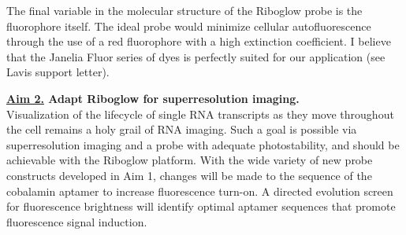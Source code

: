 
The final variable in the molecular structure of the Riboglow probe is the fluorophore itself. The ideal probe would minimize cellular autofluorescence through the use of a red fluorophore with a high extinction coefficient. I believe that the Janelia Fluor series of dyes is perfectly suited for our application (see Lavis support letter).\cite{Grimmgeneralmethodfinetune2017a} 


\textbf{\underline{Aim 2.} Adapt Riboglow for superresolution imaging.}\\
Visualization of the lifecycle of single RNA transcripts as they move throughout the cell remains a holy grail of RNA imaging.\comment{[Cite]} Such a goal is possible via superresolution imaging and a probe with adequate photostability, and should be achievable with the Riboglow platform. With the wide variety of new probe constructs developed in Aim 1, changes will be made to the sequence of the cobalamin aptamer to increase fluorescence turn-on. A directed evolution screen for fluorescence brightness will identify optimal aptamer sequences that promote fluorescence signal induction.

